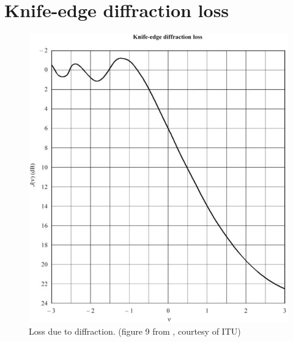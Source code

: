 \chapter{Knife-edge diffraction loss}
\begin{figure}[h]
\hspace{-1cm}
\includegraphics[scale=0.8]{figures/DiffractionLoss.PNG}
\caption{Loss due to diffraction. (figure 9 from \cite{ITU-R}, courtesy of ITU)}
\end{figure}